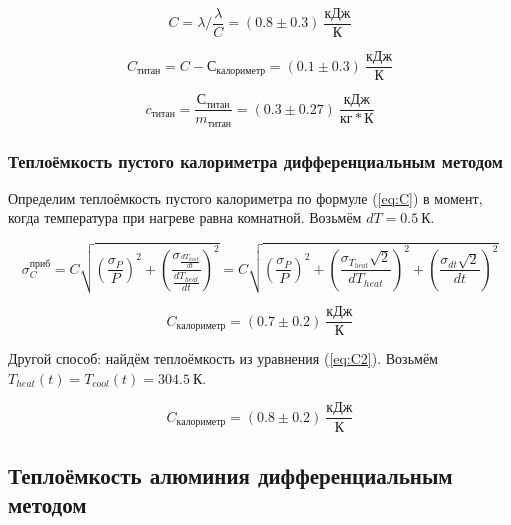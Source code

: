 \documentclass[a4paper, 12pt]{article}
\begin{document}
                \begin{equation*}
                    C = \lambda / \frac{\lambda}{C} = (0.8 \pm 0.3)~\frac{кДж}{К}
                \end{equation*}

                \begin{equation*}
                    C_{титан} = C - С_{калориметр} = (0.1 \pm 0.3)~\frac{кДж}{К}
                \end{equation*}

                \begin{equation*}
                    c_{титан} = \frac{С_{титан}}{m_{титан}} = (0.3 \pm 0.27)~\frac{кДж}{кг*К}
                \end{equation*}

            \subsubsection{Теплоёмкость пустого калориметра дифференциальным методом}

                Определим теплоёмкость пустого калориметра по формуле (\ref{eq:C}) в момент, когда температура при нагреве равна комнатной. Возьмём $dT = 0.5~К$.

                \begin{equation*}
                    \sigma_C^{приб} = C \sqrt{\left( \frac{\sigma_P}{P} \right)^2 + \left( \frac{\sigma_{\frac{dT_{heat}}{dt}}}{\frac{dT_{heat}}{dt}} \right)^2} = C \sqrt{\left( \frac{\sigma_P}{P} \right)^2 + \left( \frac{\sigma_{T_{heat}} \sqrt{2}}{dT_{heat}} \right)^2 + \left( \frac{\sigma_{dt} \sqrt{2}}{dt} \right)^2}
                \end{equation*}

                \begin{equation*}
                    C_{калориметр} = (0.7 \pm 0.2)~\frac{кДж}{К}
                \end{equation*}

                Другой способ: найдём теплоёмкость из уравнения (\ref{eq:C2}). Возьмём $T_{heat}(t) = T_{cool}(t) = 304.5~К$.

                \begin{equation*}
                    C_{калориметр} = (0.8 \pm 0.2)~\frac{кДж}{К}
                \end{equation*}

            \subsection{Теплоёмкость алюминия дифференциальным методом}
\end{document}
